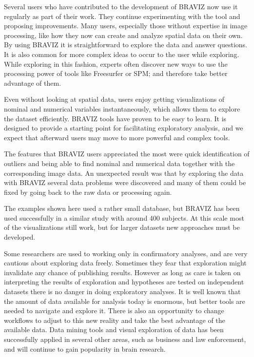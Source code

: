 \documentclass[utf8]{frontiersSCNS} %
\begin{document}
Several users who have contributed to the development of BRAVIZ now use it regularly as part of their work. They continue experimenting with the tool and proposing improvements. Many users, especially those without expertise in image processing, like how they now can create and analyze spatial data on their own.  By using BRAVIZ it is straightforward to explore the data and answer questions. It is also common for more complex ideas to occur to the user while exploring. While exploring in this fashion, experts often discover new ways to use the processing power of tools like Freesurfer or SPM; and therefore take better advantage of them.

Even without looking at spatial data, users enjoy getting visualizations of nominal and numerical variables instantaneously, which allows them to explore the dataset efficiently. BRAVIZ tools have proven to be easy to learn. It is designed to provide a starting point for facilitating exploratory analysis, and we expect that afterward users may move to more powerful and complex tools.

The features that BRAVIZ users appreciated the most were quick identification of outliers and being able to find nominal and numerical data together with the corresponding image data. An unexpected result was that by exploring the data with BRAVIZ several data problems were discovered and many of them could be fixed by going back to the raw data or processing again. 

The examples shown here used a rather small database, but BRAVIZ has been used successfully in a similar study with around 400 subjects. At this scale most of the visualizations still work, but for larger datasets new approaches must be developed. 

Some researchers are used to working only in confirmatory analyses, and are very cautious about exploring data freely. Sometimes they fear that exploration might invalidate any chance of publishing results. However as long as care is taken on interpreting the results of exploration and hypotheses are tested on independent datasets there is no danger in doing exploratory analyses. It is well known that the amount of data available for analysis today is enormous, but better tools are needed to navigate and explore it. There is also an opportunity to change workflows to adjust to this new reality and take the best advantage of the available data. Data mining tools and visual exploration of data has been successfully applied in several other areas, such as business and law enforcement, and will continue to gain popularity in brain research. 
\end{document}
